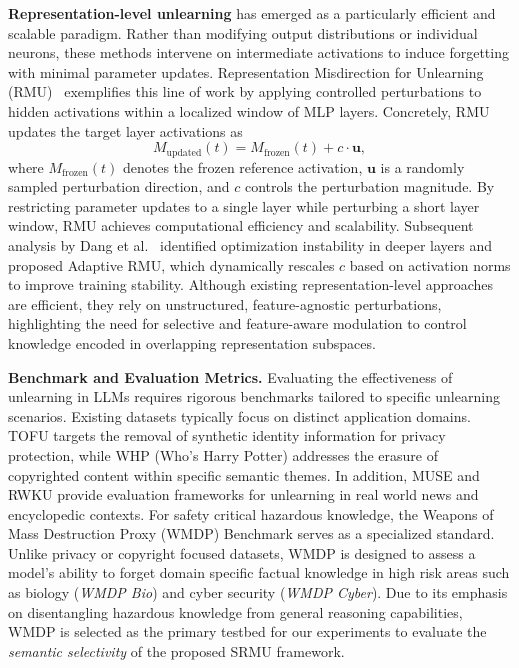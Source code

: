 \noindent\textbf{Representation-level unlearning} has emerged as a particularly efficient and scalable paradigm.
Rather than modifying output distributions or individual neurons, these methods intervene on intermediate activations to induce forgetting with minimal parameter updates.
Representation Misdirection for Unlearning (RMU)~\cite{pmlr-v235-li24bc} exemplifies this line of work by applying controlled perturbations to hidden activations within a localized window of MLP layers.
Concretely, RMU updates the target layer activations as
\begin{equation}
M_{\text{updated}}(t) = M_{\text{frozen}}(t) + c \cdot \mathbf{u},
\label{eq:rmu_perturb}
\end{equation}
where $M_{\text{frozen}}(t)$ denotes the frozen reference activation, $\mathbf{u}$ is a randomly sampled perturbation direction, and $c$ controls the perturbation magnitude.
By restricting parameter updates to a single layer while perturbing a short layer window, RMU achieves computational efficiency and scalability.
Subsequent analysis by Dang et al.~\cite{10.1609/aaai.v39i22.34544} identified optimization instability in deeper layers and proposed Adaptive RMU, which dynamically rescales $c$ based on activation norms to improve training stability. Although existing representation-level approaches are efficient, they rely on unstructured, feature-agnostic perturbations, highlighting the need for selective and feature-aware modulation to control knowledge encoded in overlapping representation subspaces.


\noindent\textbf{Benchmark and Evaluation Metrics.}
Evaluating the effectiveness of unlearning in LLMs requires rigorous benchmarks tailored to specific unlearning scenarios. Existing datasets typically focus on distinct application domains. TOFU \cite{mainitofu} targets the removal of synthetic identity information for privacy protection, while WHP (Who’s Harry Potter) \cite{eldan2023s} addresses the erasure of copyrighted content within specific semantic themes. In addition, MUSE \cite{shi2024muse} and RWKU \cite{jin2024rwku} provide evaluation frameworks for unlearning in real world news and encyclopedic contexts. For safety critical hazardous knowledge, the Weapons of Mass Destruction Proxy (WMDP) Benchmark \cite{pmlr-v235-li24bc} serves as a specialized standard. Unlike privacy or copyright focused datasets, WMDP is designed to assess a model’s ability to forget domain specific factual knowledge in high risk areas such as biology (\textit{WMDP Bio}) and cyber security (\textit{WMDP Cyber}). Due to its emphasis on disentangling hazardous knowledge from general reasoning capabilities, WMDP is selected as the primary testbed for our experiments to evaluate the \textit{semantic selectivity} of the proposed SRMU framework.


